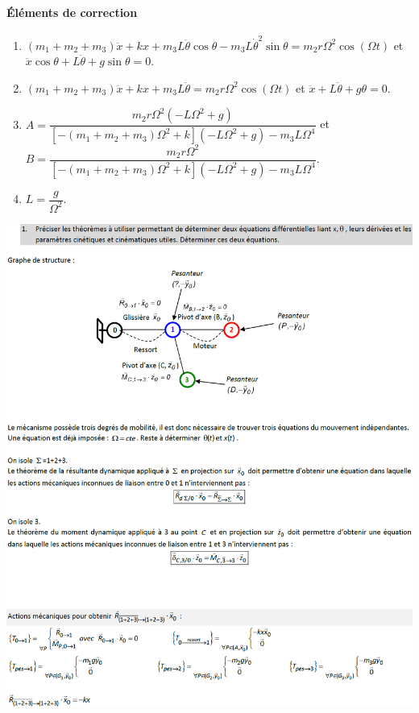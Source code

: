 \documentclass[10pt,fleqn]{article} %
\begin{document}
\begin{multicols}{2}
\paragraph*{Éléments de correction}
\footnotesize
\begin{enumerate}
\item $\left( m_1 + m_2 + m_3\right) \ddot{x} + kx + m_3 L\ddot{\theta} \cos \theta - m_3 L\dot{\theta}^2 \sin \theta = m_2 r \Omega^2 \cos \left( \Omega t \right)$ et $\ddot{x}\cos\theta+L\ddot{\theta}+g\sin\theta=0$.
\item $\left( m_1 + m_2 + m_3\right) \ddot{x} + kx + m_3 L\ddot{\theta}= m_2 r \Omega^2 \cos \left( \Omega t \right)$ et $\ddot{x}+L\ddot{\theta}+g\theta=0$.
\item $A=\dfrac{m_2 r \Omega^2 \left( -L\Omega^2 + g\right)}{\left[-\left( m_1 + m_2 + m_3\right)\Omega^2 +k\right]\left( -L\Omega^2 +g\right)-m_3L\Omega^4}$ et 
$B=\dfrac{m_2 r \Omega^2 }{\left[-\left( m_1 + m_2 + m_3\right)\Omega^2 +k\right]\left( -L\Omega^2 +g\right)-m_3L\Omega^4}$.
\item $L=\dfrac{g}{\Omega^2}$.
\end{enumerate}
\normalsize
\end{multicols}

\newpage
\begin{center}
\includegraphics[width=\linewidth]{images/cor_01}
\end{center}
\end{document}
